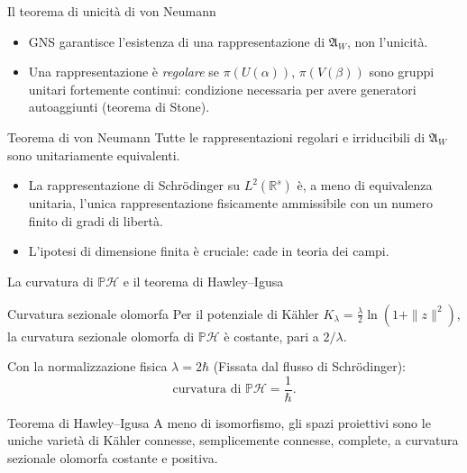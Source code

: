 \documentclass[aspectratio=169,11pt]{beamer}
\begin{document}
\begin{frame}{Il teorema di unicità di von Neumann}
	\begin{itemize}
		\item GNS garantisce l'\alert{esistenza} di una rappresentazione di $\mathfrak{A}_W$, non l'unicità.
		\item Una rappresentazione è \emph{regolare} se $\pi(U(\alpha))$, $\pi(V(\beta))$ sono gruppi unitari fortemente continui: condizione necessaria per avere generatori autoaggiunti (teorema di Stone).
	\end{itemize}
	\begin{block}{Teorema di von Neumann}
		Tutte le rappresentazioni regolari e irriducibili di $\mathfrak{A}_W$ sono unitariamente equivalenti.
	\end{block}
	\begin{itemize}
		\item La rappresentazione di Schrödinger su $L^2(\mathbb R^s)$ è, a meno di equivalenza unitaria, \alert{l'unica} rappresentazione fisicamente ammissibile con un numero finito di gradi di libertà.
		\item L'ipotesi di dimensione finita è cruciale: cade in teoria dei campi.
	\end{itemize}
\end{frame}

\begin{frame}{La curvatura di $\mathbb{P} \mathcal{H}$ e il teorema di Hawley--Igusa}
	\begin{block}{Curvatura sezionale olomorfa}
		Per il potenziale di Kähler $K_\lambda = \tfrac{\lambda}{2}\ln(1+\|z\|^2)$, la curvatura sezionale olomorfa di $\mathbb{P} \mathcal{H}$ è costante, pari a $2/\lambda$.
	\end{block}
	Con la normalizzazione fisica $\lambda = 2\hbar$ (Fissata dal flusso di Schrödinger):
	\[
	\text{curvatura di } \mathbb{P} \mathcal{H} = \frac{1}{\hbar}.
	\]
	\begin{block}{Teorema di Hawley--Igusa}
		A meno di isomorfismo, gli spazi proiettivi sono le \alert{uniche} varietà di Kähler connesse, semplicemente connesse, complete, a curvatura sezionale olomorfa costante e positiva.
	\end{block}
\end{frame}
\end{document}
